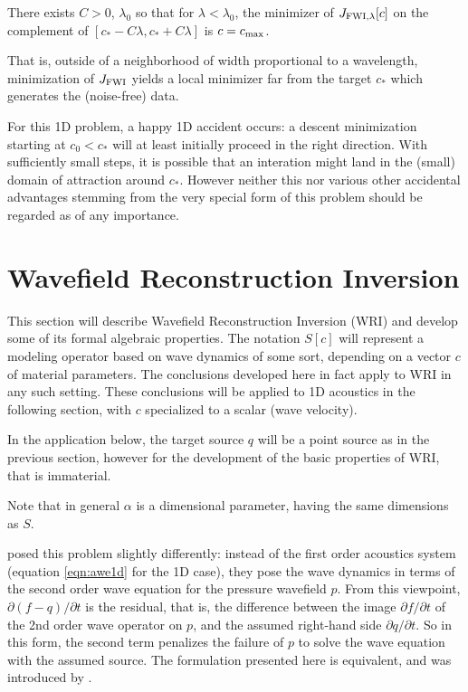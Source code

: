 \begin{theorem}
  \label{thm:thm1}
  There exists $C>0$, $\lambda_0$ so that for $\lambda <
  \lambda_0$, the minimizer of $J_{\rm FWI, \lambda}[c]$ on the
  complement of $[c_*-C\lambda, c_*+C\lambda]$ is $c=c_{\rm max}$.
\end{theorem}

That is, outside of a neighborhood of width proportional to a
wavelength, minimization of $J_{\rm FWI}$ yields a local minimizer far from
the target $c_*$ which generates the (noise-free) data.

For this 1D problem, a happy 1D accident occurs: a descent
minimization starting at $c_0 < c_*$ will at least initially proceed
in the right direction. With sufficiently small steps, it is possible
that an interation might land in the (small) domain of attraction
around $c_*$. However neither this nor various other accidental
advantages stemming from the very special form of this problem should
be regarded as of any importance.
 
\section{Wavefield Reconstruction Inversion}
This section will describe Wavefield Reconstruction Inversion (WRI)
and develop some of its formal algebraic properties. The notation
$S[c]$ will represent a modeling operator based on wave dynamics of
some sort, depending on a vector $c$ of material parameters. The
conclusions developed here in fact apply to WRI in any such
setting. These conclusions will be applied to 1D acoustics in the
following section, with $c$ specialized to a scalar (wave velocity).

In the application below, the target source $q$ will be a point source
as in the previous section, however for the development of the basic
properties of WRI, that is immaterial.

Note that in general $\alpha$ is a dimensional parameter, having the
same dimensions as $S$.

\cite{LeeuwenHerrmannWRI:13} posed this problem slightly differently:
instead of the first order acoustics system (equation \ref{eqn:awe1d}
for the 1D case), they pose the wave dynamics in terms of the second
order wave equation for the pressure wavefield $p$. From this
viewpoint, $\partial(f-q) /\partial t$ is the residual, that is, the
difference between the image $\partial f/\partial t$ of the 2nd order
wave operator on $p$, and the assumed right-hand side
$\partial q/\partial t$. So in this form, the second term penalizes
the failure of $p$ to solve the wave equation with the assumed
source. The formulation presented here is equivalent, and was
introduced by \cite{WangYingst:SEG16}.

